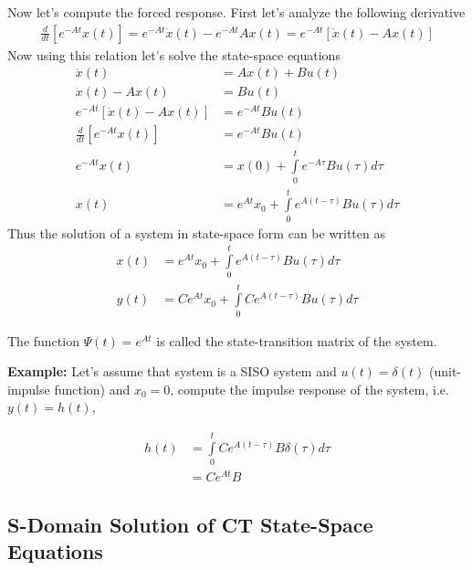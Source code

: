 \documentclass[twoside]{article}
\begin{document}
Now let's compute the forced response. First let's analyze the
following derivative
%
\begin{align*}
\frac{d}{dt} \left[ e^{-A t} x(t) \right] = e^{-A t} \dot{x}(t) - e^{-A t} A
  x(t) = e^{-A t} \left[ \dot{x}(t) - A x(t) \right]
\end{align*}
%
Now using this relation let's solve the state-space equations
%
\begin{align*}
  \dot{x}(t) &= A x(t) + B u(t)
\\ 
  \dot{x}(t) - A x(t) &=  B u(t)
\\
  e^{-A t}  \left[ \dot{x}(t) - A x(t) \right] &=  e^{-A t} B u(t)
\\
  \frac{d}{dt} \left[ e^{-A t} x(t) \right] &=  e^{-A t} B u(t)
\\
  e^{-A t} x(t) &= x(0) + \int\limits_{0}^{t} e^{-A \tau} B u(\tau) d
                  \tau
\\
x(t) &= e^{A t} x_0 + \int\limits_{0}^{t} e^{A ( t - \tau ) } B u(\tau) d
                  \tau
\end{align*}
%
Thus the solution of a system in state-space form can be written as
%
\begin{align*}
  x(t) &= e^{A t} x_0 + \int\limits_{0}^{t} e^{A ( t - \tau ) } B u(\tau) d
                  \tau
\\
  y(t) &= C e^{A t} x_0 + \int\limits_{0}^{t} C e^{A ( t - \tau ) } B u(\tau) d
                  \tau 
\end{align*}
%

The function $\Psi(t) = e^{A t}$ is called the state-transition matrix
of the system. 

\textbf{Example:} Let's assume that system is a SISO system and
$u(t) = \delta({t})$ (unit-impulse function) and $x_0 = 0$, compute 
the impulse response of the system, i.e. $y(t) = h(t)$,

\begin{align*}
  h(t) &= \int\limits_{0}^{t} C e^{A ( t - \tau ) } B \delta(\tau) d
                  \tau
\\
   &= C e^{A t } B 
\end{align*}

\subsection{S-Domain Solution of CT State-Space Equations}
\end{document}
